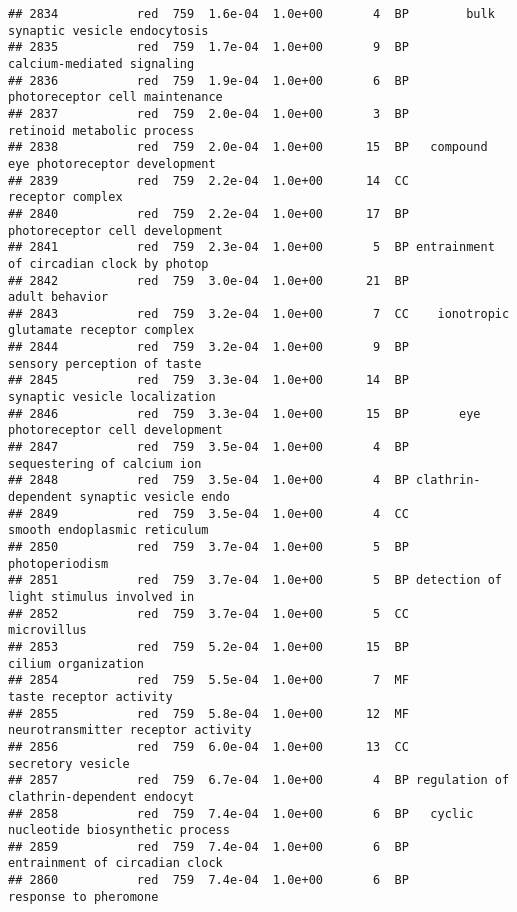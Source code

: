 \documentclass[]{article}
\begin{document}
\begin{verbatim}
## 2834           red  759  1.6e-04  1.0e+00       4  BP        bulk synaptic vesicle endocytosis
## 2835           red  759  1.7e-04  1.0e+00       9  BP               calcium-mediated signaling
## 2836           red  759  1.9e-04  1.0e+00       6  BP           photoreceptor cell maintenance
## 2837           red  759  2.0e-04  1.0e+00       3  BP               retinoid metabolic process
## 2838           red  759  2.0e-04  1.0e+00      15  BP   compound eye photoreceptor development
## 2839           red  759  2.2e-04  1.0e+00      14  CC                         receptor complex
## 2840           red  759  2.2e-04  1.0e+00      17  BP           photoreceptor cell development
## 2841           red  759  2.3e-04  1.0e+00       5  BP entrainment of circadian clock by photop
## 2842           red  759  3.0e-04  1.0e+00      21  BP                           adult behavior
## 2843           red  759  3.2e-04  1.0e+00       7  CC    ionotropic glutamate receptor complex
## 2844           red  759  3.2e-04  1.0e+00       9  BP              sensory perception of taste
## 2845           red  759  3.3e-04  1.0e+00      14  BP            synaptic vesicle localization
## 2846           red  759  3.3e-04  1.0e+00      15  BP       eye photoreceptor cell development
## 2847           red  759  3.5e-04  1.0e+00       4  BP              sequestering of calcium ion
## 2848           red  759  3.5e-04  1.0e+00       4  BP clathrin-dependent synaptic vesicle endo
## 2849           red  759  3.5e-04  1.0e+00       4  CC             smooth endoplasmic reticulum
## 2850           red  759  3.7e-04  1.0e+00       5  BP                           photoperiodism
## 2851           red  759  3.7e-04  1.0e+00       5  BP detection of light stimulus involved in 
## 2852           red  759  3.7e-04  1.0e+00       5  CC                              microvillus
## 2853           red  759  5.2e-04  1.0e+00      15  BP                      cilium organization
## 2854           red  759  5.5e-04  1.0e+00       7  MF                  taste receptor activity
## 2855           red  759  5.8e-04  1.0e+00      12  MF       neurotransmitter receptor activity
## 2856           red  759  6.0e-04  1.0e+00      13  CC                        secretory vesicle
## 2857           red  759  6.7e-04  1.0e+00       4  BP regulation of clathrin-dependent endocyt
## 2858           red  759  7.4e-04  1.0e+00       6  BP   cyclic nucleotide biosynthetic process
## 2859           red  759  7.4e-04  1.0e+00       6  BP           entrainment of circadian clock
## 2860           red  759  7.4e-04  1.0e+00       6  BP                    response to pheromone

\end{verbatim}
\end{document}
